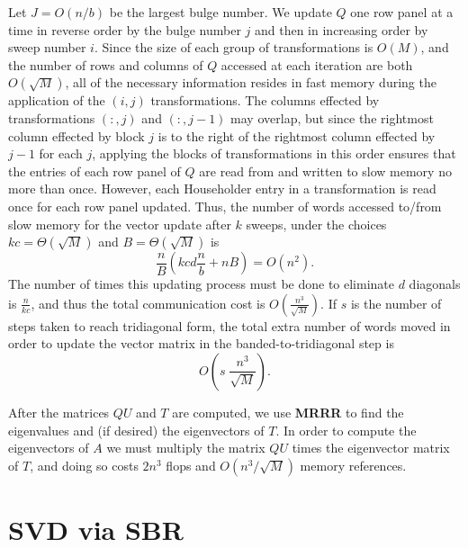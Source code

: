 \documentclass{article}
\def\lt{\left}
\def\rt{\right}
\theoremstyle{definition}
\begin{document}
Let $J=O(n/b)$ be the largest bulge number. We update $Q$ one row panel at a time in reverse order by the bulge number $j$ and then in increasing order by sweep number $i$.  Since the size of each group of transformations is $O(M)$, and the number of rows and columns of $Q$ accessed at each iteration are both $O(\sqrt M)$, all of the necessary information resides in fast memory during the application of the $(i,j)$ transformations.  The columns effected by transformations $(:,j)$ and $(:,j-1)$ may overlap, but since the rightmost column effected by block $j$ is to the right of the rightmost column effected by $j-1$ for each $j$, applying the blocks of transformations in this order ensures that the entries of each row panel of $Q$ are read from and written to slow memory no more than once.  However, each Householder entry in a transformation is read once for each row panel updated.  Thus, the number of words accessed to/from slow memory for the vector update after $k$ sweeps, under the choices $kc=\Theta(\sqrt M)$ and $B=\Theta(\sqrt M)$ is 
$$\frac nB\lt(kcd\frac nb+nB\rt) = O(n^2).$$
The number of times this updating process must be done to eliminate $d$ diagonals is $\frac{n}{kc}$, and thus the total communication cost is $O\lt(\frac{n^3}{\sqrt M}\rt)$.  If $s$ is the number of steps taken to reach tridiagonal form, the total extra number of words moved in order to update the vector matrix in the banded-to-tridiagonal step is 
$$O\lt(s\;\frac{n^3}{\sqrt M}\rt).$$

After the matrices $QU$ and $T$ are computed, we use \textbf{MRRR} to find the eigenvalues and (if desired) the eigenvectors of $T$.  In order to compute the eigenvectors of $A$ we must multiply the matrix $QU$ times the eigenvector matrix of $T$, and doing so costs $2n^3$ flops and $O(n^3/\sqrt M)$ memory references.

\section{SVD via SBR}
\label{app:SVD}
\end{document}

